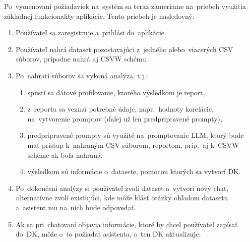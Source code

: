 Po~vymenovaní požiadaviek na~systém sa teraz zameriame na~priebeh využitia základnej funkcionality aplikácie. Tento priebeh je nasledovný:
\begin{enumerate}
\item Používateľ sa zaregistruje a~prihlási do~aplikácie.
\item Používateľ nahrá dataset pozostavajúci z~jedného alebo~viacerých CSV súborov, prípadne nahrá aj CSVW schému.
\item Po~nahratí súborov sa vykoná analýza, t.j.:
\begin{enumerate}
\item spustí sa dátové profilovanie, ktorého výsledkom je report,
\item z~reportu sa vezmú potrebné údaje, napr.~hodnoty korelácie, na~vytvorenie promptov (ďalej už len predpripravené prompty),
\item predpripravené prompty sú využité na~promptovanie LLM, ktorý bude mať prístup k~nahraným CSV súborom, reportom, príp.~aj k~CSVW schéme ak bola nahraná,
\item výsledkom sú informácie o~datasete, pomocou ktorých sa vytvorí DK. \end{enumerate}
\item Po~dokončení analýzy si používateľ zvolí dataset a~vytvorí nový chat, alternatívne zvolí existujúci, kde môže klásť otázky ohľadom datasetu a~asistent mu na~nich bude odpovedať.
\item Ak sa pri~chatovaní objavia informácie, ktoré by chcel používateľ zapísať do~DK, môže o~to požiadať asistenta, a~ten DK aktualizuje. \end{enumerate}

